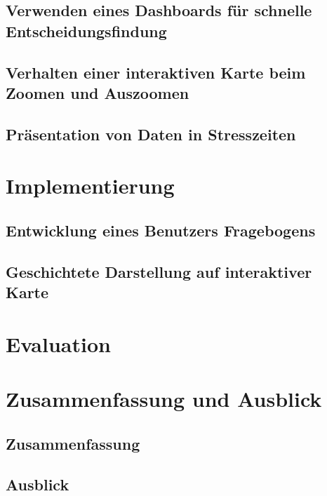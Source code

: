 \section{Verwenden eines Dashboards für schnelle Entscheidungsfindung}
\section{Verhalten einer interaktiven Karte beim Zoomen und Auszoomen}
\section{Präsentation von Daten in Stresszeiten}

\chapter{Implementierung}
\section{Entwicklung eines Benutzers Fragebogens}
\section{Geschichtete Darstellung auf interaktiver Karte}

\chapter{Evaluation}

\chapter{Zusammenfassung und Ausblick}
\section{Zusammenfassung}
\section{Ausblick}
